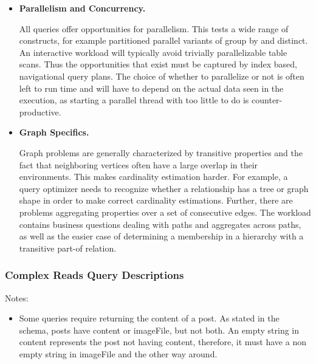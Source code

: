 \begin{itemize}
    \item \textbf{Parallelism and Concurrency.}

        All queries offer opportunities for parallelism.  This tests a wide
        range of constructs, for example partitioned parallel variants of
        group by and distinct.  An interactive workload will typically avoid
        trivially parallelizable table scans.  Thus the opportunities that
        exist must be captured by index based, navigational query plans.  The
        choice of whether to parallelize or not is often left to run time and
        will have to depend on the actual data seen in the execution, as
        starting a parallel thread with too little to do is
        counter-productive.


    \item \textbf{Graph Specifics.}

        Graph problems are generally characterized by transitive properties
        and the fact that neighboring vertices often have a large overlap in
        their environments.  This makes cardinality estimation harder.  For
        example, a query optimizer needs to recognize whether a relationship
        has a tree or graph shape in order to make correct cardinality
        estimations.  Further, there are problems aggregating properties over
        a set of consecutive edges.  The workload contains business questions
        dealing with paths and aggregates across paths, as well as the easier
        case of determining a membership in a hierarchy with a transitive
        part-of relation.
\end{itemize}
\subsubsection{Complex Reads Query Descriptions}
\label{sub:queries}

Notes:
\begin{itemize}
    \item Some queries require returning the content of a post. As stated in the
        schema, posts have content or imageFile, but not both. An empty string in
        content represents the post not having content, therefore, it must have a
        non empty string in imageFile and the other way around.
\end{itemize}

